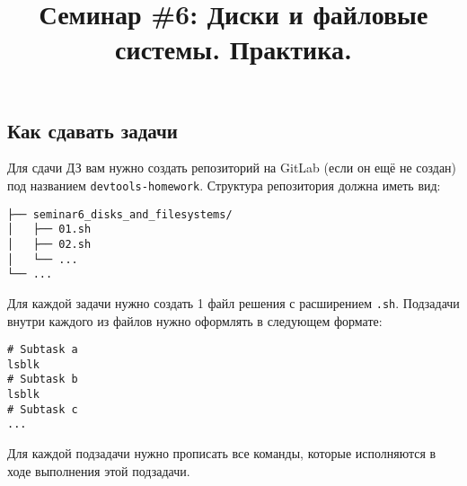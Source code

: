 \documentclass{article}
\begin{document}
\title{Семинар \#6: Диски и файловые системы. Практика. \vspace{-5ex}}\date{}\maketitle
\subsection*{Как сдавать задачи}
Для сдачи ДЗ вам нужно создать репозиторий на GitLab (если он ещё не создан) под названием \texttt{devtools-homework}. Структура репозитория должна иметь вид:
\begin{center}
\begin{BVerbatim}
├── seminar6_disks_and_filesystems/
│   ├── 01.sh
│   ├── 02.sh
│   └── ...
└── ...
\end{BVerbatim}
\end{center}
Для каждой задачи нужно создать 1 файл решения с расширением \texttt{.sh}. Подзадачи внутри каждого из файлов нужно оформлять в следующем формате:
\begin{lstlisting}
# Subtask a
lsblk
# Subtask b
lsblk
# Subtask c
...
\end{lstlisting}
Для каждой подзадачи нужно прописать все команды, которые исполняются в ходе выполнения этой подзадачи.\\
\end{document}
